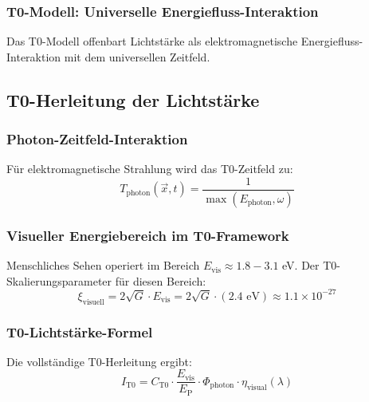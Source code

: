 \documentclass[12pt,a4paper]{article}
\newcommand{\xipar}{\xi}
\newcommand{\EP}{E_{\text{P}}}
\newcommand{\Evis}{E_{\text{vis}}}
\newcommand{\Cto}{C_{\text{T0}}}
\newcommand{\etavis}{\eta_{\text{visual}}}
\newcommand{\Phiphoton}{\Phi_{\text{photon}}}
\begin{document}
	\subsubsection{T0-Modell: Universelle Energiefluss-Interaktion}
	\label{subsubsec:t0_universeller_fluss}
	
	Das T0-Modell offenbart Lichtstärke als elektromagnetische Energiefluss-Interaktion mit dem universellen Zeitfeld.
	
	\subsection{T0-Herleitung der Lichtstärke}
	\label{subsec:t0_candela_herleitung}
	
	\subsubsection{Photon-Zeitfeld-Interaktion}
	\label{subsubsec:photon_zeitfeld}
	
	Für elektromagnetische Strahlung wird das T0-Zeitfeld zu:
	\begin{equation}
		T_{\text{photon}}(\vec{x},t) = \frac{1}{\max(E_{\text{photon}}, \omega)}
		\label{eq:photon_zeitfeld}
	\end{equation}
	
	\subsubsection{Visueller Energiebereich im T0-Framework}
	\label{subsubsec:visueller_energiebereich}
	
	Menschliches Sehen operiert im Bereich $\Evis \approx 1.8 - 3.1$ eV. Der T0-Skalierungsparameter für diesen Bereich:
	\begin{equation}
		\xipar_{\text{visuell}} = 2\sqrt{G} \cdot \Evis = 2\sqrt{G} \cdot (2.4 \text{ eV}) \approx 1.1 \times 10^{-27}
		\label{eq:xi_visuell}
	\end{equation}
	
	\subsubsection{T0-Lichtstärke-Formel}
	\label{subsubsec:t0_lichtstaerke_formel}
	
	Die vollständige T0-Herleitung ergibt:
	\begin{equation}
		\boxed{I_{\text{T0}} = \Cto \cdot \frac{\Evis}{\EP} \cdot \Phiphoton \cdot \etavis(\lambda)}
		\label{eq:t0_candela_fundamental}
	\end{equation}
	
\end{document}
